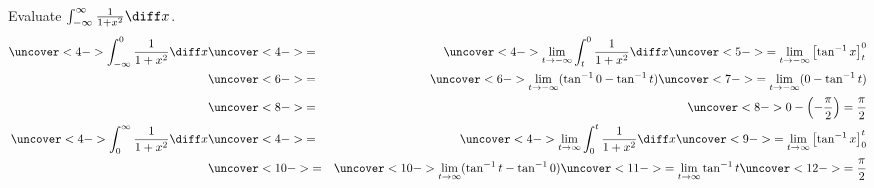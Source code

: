 \begin{frame}
\begin{example}[Example 3, p. 546]
Evaluate $\int_{-\infty}^\infty \frac{1}{1+x^2}\diff x$.
\abovedisplayskip=0pt
\belowdisplayskip=0pt
%
\begin{eqnarray*}
\uncover<4->{%
\int_{-\infty}^0 \frac{1}{1+x^2}\diff x%
}%
& \uncover<4->{ = } &%
\uncover<4->{%
\lim_{t\rightarrow -\infty} \int_{t}^0 \frac{1}{1+x^2}\diff x%
}%
\uncover<5->{%
 = \lim_{t\rightarrow -\infty} \left[ \tan^{-1} x\right]_t^0%
}\\%
& \uncover<6->{ = } &%
\uncover<6->{%
\lim_{t\rightarrow -\infty} (\tan^{-1} 0 - \tan^{-1} t)%
}%
\uncover<7->{%
 = \lim_{t\rightarrow -\infty}  (0 -\tan^{-1} t) %
}\\%
& \uncover<8->{ = } &%
\uncover<8->{%
0 - \left( -\frac{\pi}{2}\right) = \frac{\pi}{2}%
}\\%
\uncover<4->{%
\int_0^{\infty} \frac{1}{1+x^2}\diff x%
}%
& \uncover<4->{ = } &%
\uncover<4->{%
\lim_{t\rightarrow \infty} \int_{0}^t \frac{1}{1+x^2}\diff x%
}%
\uncover<9->{%
 = \lim_{t\rightarrow \infty} \left[ \tan^{-1} x\right]_0^t%
}\\%
& \uncover<10->{ = } &%
\uncover<10->{%
\lim_{t\rightarrow \infty} (\tan^{-1} t - \tan^{-1} 0)%
}%
\uncover<11->{%
 = \lim_{t\rightarrow \infty} \tan^{-1} t %
}%
\uncover<12->{%
 = \frac{\pi}{2}
}%
\end{eqnarray*}
\end{example}
\end{frame}
